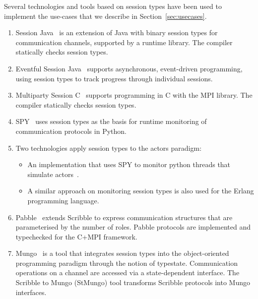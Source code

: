 Several technologies and tools based on session types have been used to implement the use-cases that we describe in Section~\ref{sec:usecases}.
%
\begin{enumerate}
	\item	Session Java~\cite{HU07TYPE-SAFE} is an extension of Java with binary session types for communication channels, supported by a runtime library. The compiler statically checks session types.

	\item	Eventful Session Java~\cite{event} supports asynchronous, event-driven programming, using session types to track progress through individual sessions.

	\item	Multiparty Session C~\cite{NYH12} supports programming in C with the MPI library. The compiler statically checks session types.

	\item	SPY~\cite{DBLP:conf/rv/NeykovaYH13} uses session types as the basis for runtime monitoring of communication protocols in Python.

	\item	Two technologies apply session types to the actors paradigm:
			\begin{itemize}
				\item	An implementation that uses SPY to
						monitor python threads that simulate actors~\cite{DBLP:conf/coordination/NeykovaY14}.
				\item	A similar approach on monitoring session types is also used for the
						Erlang programming language. %
			\end{itemize}

	\item	Pabble~\cite{DBLP:conf/pdp/NgY14} extends Scribble to express
			communication structures that are parameterised by the number of roles.
			Pabble protocols are implemented and typechecked for the C+MPI framework.

	\item	Mungo~\cite{mungo} is a tool that integrates session types into the object-oriented
			programming paradigm through the notion of typestate. Communication
			operations on a channel are accessed via a state-dependent interface.
			The Scribble to Mungo (StMungo) tool transforms Scribble
			protocols into Mungo interfaces.



\end{enumerate}
